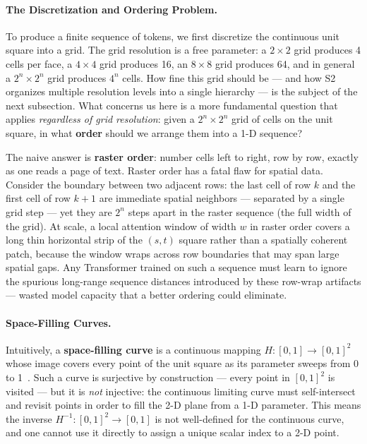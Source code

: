 \documentclass{book}
\begin{document}
\paragraph{The Discretization and Ordering Problem.}

To produce a finite sequence of tokens, we first discretize the
continuous unit square into a grid.  The grid resolution is a free
parameter: a $2 \times 2$ grid produces 4 cells per face, a
$4 \times 4$ grid produces 16, an $8 \times 8$ grid produces 64, and
in general a $2^n \times 2^n$ grid produces $4^n$ cells.  How fine
this grid should be --- and how S2 organizes multiple resolution
levels into a single hierarchy --- is the subject of the next
subsection.  What concerns us here is a more fundamental question
that applies \emph{regardless of grid resolution}: given a
$2^n \times 2^n$ grid of cells on the unit square, in what
\textbf{order} should we arrange them into a 1-D sequence?

The naive answer is \textbf{raster order}: number cells left to
right, row by row, exactly as one reads a page of text.  Raster order
has a fatal flaw for spatial data.  Consider the boundary between two
adjacent rows: the last cell of row $k$ and the first cell of row
$k+1$ are immediate spatial neighbors --- separated by a single grid
step --- yet they are $2^n$ steps apart in the raster sequence (the
full width of the grid).  At scale, a local attention window of width
$w$ in raster order covers a long thin horizontal strip of the $(s,t)$
square rather than a spatially coherent patch, because the window
wraps across row boundaries that may span large spatial gaps.  Any
Transformer trained on such a sequence must learn to ignore the
spurious long-range sequence distances introduced by these row-wrap
artifacts --- wasted model capacity that a better ordering could
eliminate.

\paragraph{Space-Filling Curves.}

Intuitively, a \textbf{space-filling curve} is a continuous mapping
$H: [0,1] \to [0,1]^2$ whose image covers every point of the unit
square as its parameter sweeps from 0 to 1~\cite{sagan1994space}.
Such a curve is surjective by construction --- every point in
$[0,1]^2$ is visited --- but it is \emph{not} injective: the
continuous limiting curve must self-intersect and revisit points in
order to fill the 2-D plane from a 1-D parameter.  This means the
inverse $H^{-1}: [0,1]^2 \to [0,1]$ is not well-defined for the
continuous curve, and one cannot use it directly to assign a unique
scalar index to a 2-D point.
\end{document}

